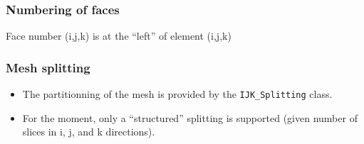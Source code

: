 \documentclass[10pt]{beamer}
\begin{document}
\begin{frame}[fragile]
\frametitle{Numbering of faces}
Face number (i,j,k) is at the ``left'' of element (i,j,k)

\end{frame}
\begin{frame}[fragile]
\frametitle{Mesh splitting}
\begin{itemize}
  \item The partitionning of the mesh is provided by the \verb|IJK_Splitting| class.
  \item For the moment, only a ``structured'' splitting is supported (given number of
   slices in i, j, and k directions).
\end{itemize}
\end{frame}
\end{document}
